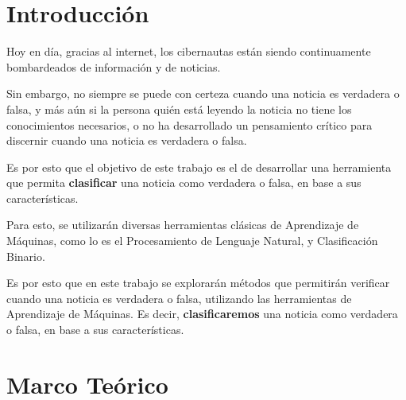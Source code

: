 \section{Introducción}
{

Hoy en día, gracias al internet, los cibernautas están siendo continuamente bombardeados de información y de noticias.

Sin embargo, no siempre se puede con certeza cuando una noticia es verdadera o falsa, y más aún si la persona quién
está leyendo la noticia no tiene los conocimientos necesarios, o no ha desarrollado un pensamiento crítico para discernir 
cuando una noticia es verdadera o falsa.

Es por esto que el objetivo de este trabajo es el de desarrollar una herramienta que permita \textbf{clasificar} una noticia como verdadera o falsa, en base a sus características.

Para esto, se utilizarán diversas herramientas clásicas de Aprendizaje de Máquinas, como lo es el Procesamiento de Lenguaje Natural, y Clasificación Binario.   


Es por esto que en este trabajo se explorarán métodos que permitirán verificar cuando una noticia es verdadera o falsa, utilizando las
herramientas de Aprendizaje de Máquinas. Es decir, \textbf{clasificaremos} una noticia como verdadera o falsa, en base a sus características.


}

\section{Marco Teórico}
{

\lipsum[2]
}

